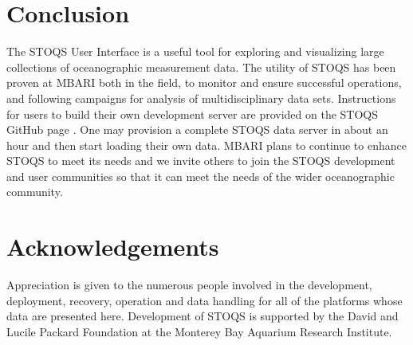 \documentclass[conference]{IEEEtran}
\begin{document}
\section{Conclusion}
The STOQS User Interface is a useful tool for exploring and visualizing 
large collections  of oceanographic measurement data.  
The utility of STOQS has been proven at MBARI both in 
the field, to monitor and ensure successful operations, and
following campaigns for analysis of multidisciplinary data sets.
Instructions for users to build their own development server are provided
on the STOQS GitHub page \cite{stoqs_github}. One may provision a 
complete STOQS data server in about an hour and then start loading their
own data. MBARI plans to continue to enhance STOQS to meet its needs and we
invite others to join the STOQS development and user communities so that it
can meet the needs of the wider oceanographic community.




\section*{Acknowledgements}

Appreciation is given to the numerous people involved in the development, 
deployment, recovery, operation and data handling for all of the platforms 
whose data are presented here. Development of STOQS is supported by the 
David and Lucile Packard Foundation at the Monterey Bay Aquarium Research Institute.








%




\end{document}
